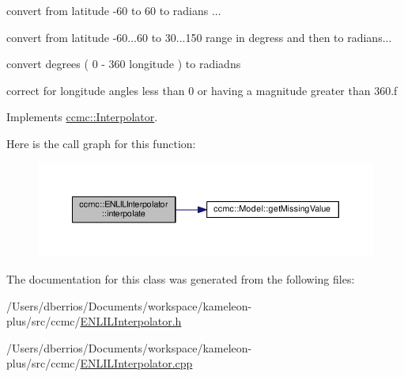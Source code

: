 convert from latitude -\/60 to 60 to radians ...

convert from latitude -\/60...60 to 30...150 range in degress and then to radians...

convert degrees ( 0 -\/ 360 longitude ) to radiadns

correct for longitude angles less than 0 or having a magnitude greater than 360.\-f

Implements \hyperlink{classccmc_1_1_interpolator_aa6b272bd53630020d92938ec1e5cfad9}{ccmc\-::\-Interpolator}.



Here is the call graph for this function\-:
\nopagebreak
\begin{figure}[H]
\begin{center}
\leavevmode
\includegraphics[width=350pt]{classccmc_1_1_e_n_l_i_l_interpolator_a92508c6305deec651299b7e70ee3c531_cgraph}
\end{center}
\end{figure}




The documentation for this class was generated from the following files\-:\begin{DoxyCompactItemize}
\item 
/\-Users/dberrios/\-Documents/workspace/kameleon-\/plus/src/ccmc/\hyperlink{_e_n_l_i_l_interpolator_8h}{E\-N\-L\-I\-L\-Interpolator.\-h}\item 
/\-Users/dberrios/\-Documents/workspace/kameleon-\/plus/src/ccmc/\hyperlink{_e_n_l_i_l_interpolator_8cpp}{E\-N\-L\-I\-L\-Interpolator.\-cpp}\end{DoxyCompactItemize}
